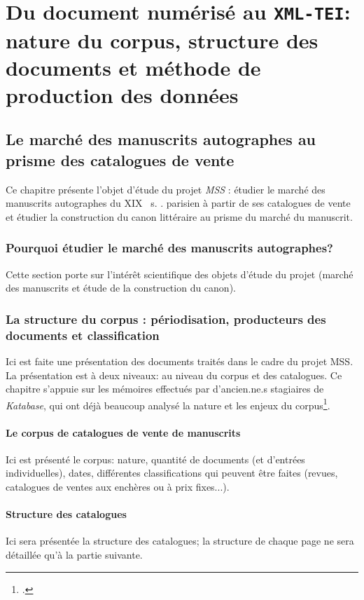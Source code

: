 \documentclass[a4paper, 12pt, twoside]{book}
\newcommand{\scl}[1]{%
	#1%
	\ifthenelse{\equal{#1}{I}}{\up{er}}{\up{ème}}%
	~s.%
}
\newcommand{\ktb}{\textit{Katabase}}
\newcommand{\mss}{\textit{MSS}}
\newcommand{\xmltei}{\texttt{XML-TEI}}
\begin{document}
\part{Du document numérisé au \xmltei: nature du corpus, structure des documents et méthode de production des données}
\chapter{Le marché des manuscrits autographes au prisme des catalogues de vente}
Ce chapitre présente l'objet d'étude du projet \mss{} : étudier le marché des manuscrits autographes du \scl{XIX}. parisien à partir de ses catalogues de vente et étudier la construction du canon littéraire au prisme du marché du manuscrit.

\section{Pourquoi étudier le marché des manuscrits autographes?}
Cette section porte sur l'intérêt scientifique des objets d'étude du projet (marché des manuscrits et étude de la construction du canon).


\section{La structure du corpus : périodisation, producteurs des documents et classification}
Ici est faite une présentation des documents traités dans le cadre du projet MSS. La présentation est à deux niveaux: au niveau du corpus et des catalogues. Ce chapitre s'appuie sur les mémoires effectués par d'ancien.ne.s stagiaires de \ktb{}, qui ont déjà beaucoup analysé la nature et les enjeux du corpus\footcite{rondeau_du_noyer_encoder_2019, corbieres_du_2020, janes_du_2021}.

\subsection{Le corpus de catalogues de vente de manuscrits}
Ici est présenté le corpus: nature, quantité de documents (et d'entrées individuelles), dates, différentes classifications qui peuvent être faites (revues, catalogues de ventes aux enchères ou à prix fixes...).

\subsection{Structure des catalogues}
Ici sera présentée la structure des catalogues; la structure de chaque page ne sera détaillée qu'à la partie suivante.
\end{document}
